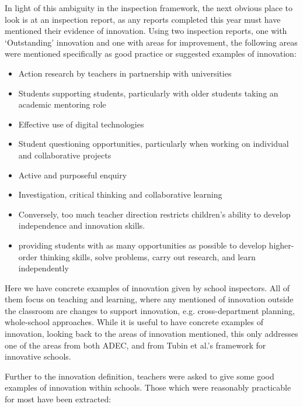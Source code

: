 \documentclass[11pt]{article}
\begin{document}
In light of this ambiguity in the inspection framework, the next obvious place to look is at an inspection report, as any reports completed this year must have mentioned their evidence of innovation. Using two inspection reports, one with `Outstanding' innovation and one with areas for improvement, the following areas were mentioned specifically as good practice or suggested examples of innovation:
\begin{itemize}
	\item Action research by teachers in partnership with universities
	\item Students supporting students, particularly with older students taking an academic mentoring role
	\item Effective use of digital technologies
	\item Student questioning opportunities, particularly when working on individual and collaborative projects
	\item Active and purposeful enquiry 
	\item Investigation, critical thinking and collaborative learning
	\item Conversely, too much teacher direction restricts children's ability to develop independence and innovation skills.
	\item providing students with as many opportunities as possible to develop higher-order thinking skills, solve problems, carry out research, and learn independently
\end{itemize}

Here we have concrete examples of innovation given by school inspectors. All of them focus on teaching and learning, where any mentioned of innovation outside the classroom are changes to support innovation, e.g. cross-department planning, whole-school approaches. While it is useful to have concrete examples of innovation, looking back to the areas of innovation mentioned, this only addresses one of the areas from both ADEC, and from Tubin et al.'s framework for innovative schools.

Further to the innovation definition, teachers were asked to give some good examples of innovation within schools. Those which were reasonably practicable for most have been extracted: 
\end{document}
